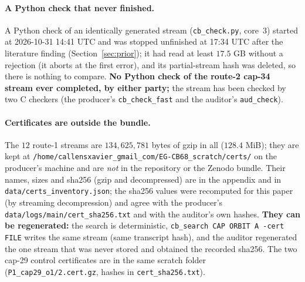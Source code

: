 \documentclass[10pt]{article}
\begin{document}
\paragraph{A Python check that never finished.} A Python check of an identically generated stream (\texttt{cb\_check.py}, core~3) started at 2026-10-31 14:41 UTC and was stopped unfinished at 17:34 UTC after the literature finding (Section~\ref{sec:prior}); it had read at least $17.5$ GB without a rejection (it aborts at the first error), and its partial-stream hash was deleted, so there is nothing to compare. \textbf{No Python check of the route-2 cap-34 stream ever completed, by either party;} the stream has been checked by two C checkers (the producer's \texttt{cb\_check\_fast} and the auditor's \texttt{aud\_check}).
\paragraph{Certificates are outside the bundle.} The $12$ route-1 streams are $134{,}625{,}781$ bytes of gzip in all ($128.4$ MiB); they are kept at \texttt{/home/callensxavier\_gmail\_com/EG-CB68\_scratch/certs/} on the producer's machine and are \emph{not} in the repository or the Zenodo bundle. Their names, sizes and sha256 (gzip and decompressed) are in the appendix and in \texttt{data/certs\_inventory.json}; the sha256 values were recomputed for this paper (by streaming decompression) and agree with the producer's \texttt{data/logs/main/cert\_sha256.txt} and with the auditor's own hashes. \textbf{They can be regenerated:} the search is deterministic, \texttt{cb\_search CAP ORBIT A -cert FILE} writes the same stream (same transcript hash), and the auditor regenerated the one stream that was never stored and obtained the recorded sha256. The two cap-29 control certificates are in the same scratch folder (\texttt{P1\_cap29\_o1/2.cert.gz}, hashes in \texttt{cert\_sha256.txt}).

\end{document}
